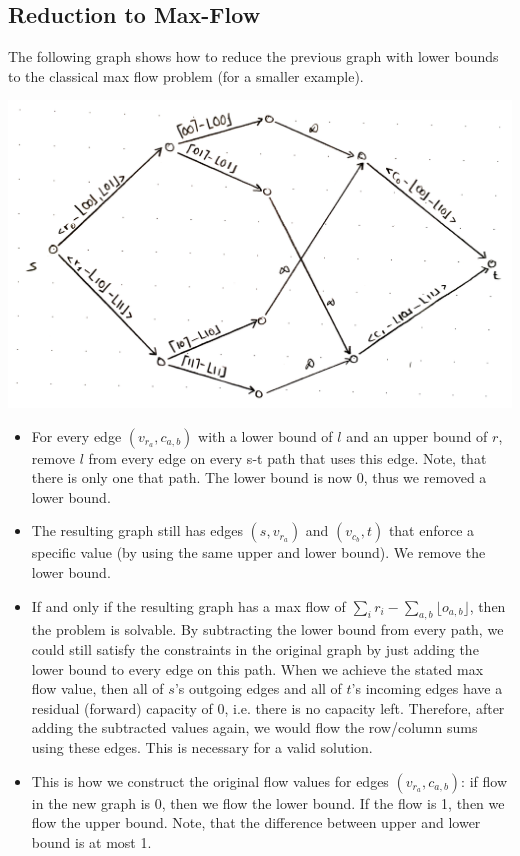 \documentclass[12pt]{article}
\begin{document}
\subsection*{Reduction to Max-Flow}
The following graph shows how to reduce the previous graph with lower bounds to the classical max flow problem (for a smaller example).

\includegraphics[width=\textwidth]{3_b_2.pdf}

\begin{itemize}
	\item For every edge $(v_{r_a}, c_{a,b})$ with a lower bound of $l$ and an upper bound of $r$, remove $l$ from every edge on every s-t path that uses this edge. Note, that there is only one that path. The lower bound is now 0, thus we removed a lower bound.
	\item The resulting graph still has edges $(s, v_{r_a})$ and $(v_{c_b}, t)$ that enforce a specific value (by using the same upper and lower bound). We remove the lower bound.
	\item If and only if the resulting graph has a max flow of $\sum_{i} r_i - \sum_{a,b} \lfloor o_{a,b}\rfloor$, then the problem is solvable. By subtracting the lower bound from every path, we could still satisfy the constraints in the original graph by just adding the lower bound to every edge on this path. When we achieve the stated max flow value, then all of $s$'s outgoing edges and all of $t$'s incoming edges have a residual (forward) capacity of 0, i.e. there is no capacity left. Therefore, after adding the subtracted values again, we would flow the row/column sums using these edges. This is necessary for a valid solution.
	\item This is how we construct the original flow values for edges $(v_{r_a}, c_{a,b})$: if flow in the new graph is 0, then we flow the lower bound. If the flow is 1, then we flow the upper bound. Note, that the difference between upper and lower bound is at most 1.
\end{itemize}
\end{document}
